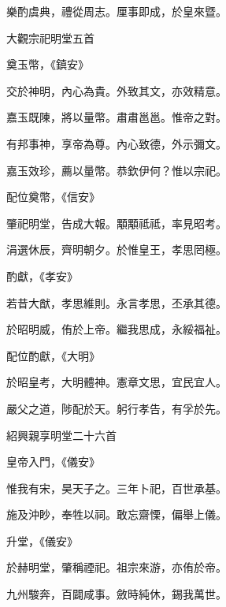 \begin{pinyinscope}
 樂酌虞典，禮從周志。厘事即成，於皇來暨。



 大觀宗祀明堂五首



 奠玉幣，《鎮安》



 交於神明，內心為貴。外致其文，亦效精意。



 嘉玉既陳，將以量幣。肅肅邕邕。惟帝之對。



 有邦事神，享帝為尊。內心致德，外示彌文。



 嘉玉效珍，薦以量幣。恭欽伊何？惟以宗祀。



 配位奠幣，《信安》



 肇祀明堂，告成大報。顒顒祗祗，率見昭考。



 涓選休辰，齊明朝夕。於惟皇王，孝思罔極。



 酌獻，《孝安》



 若昔大猷，孝思維則。永言孝思，丕承其德。



 於昭明威，侑於上帝。繼我思成，永綏福祉。



 配位酌獻，《大明》



 於昭皇考，大明體神。憲章文思，宜民宜人。



 嚴父之道，陟配於天。躬行孝告，有孚於先。



 紹興親享明堂二十六首



 皇帝入門，《儀安》



 惟我有宋，昊天子之。三年卜祀，百世承基。



 施及沖眇，奉牲以祠。敢忘齋慄，偏舉上儀。



 升堂，《儀安》



 於赫明堂，肇稱禋祀。祖宗來游，亦侑於帝。



 九州駿奔，百闢咸事。斂時純休，錫我萬世。




\end{pinyinscope}
